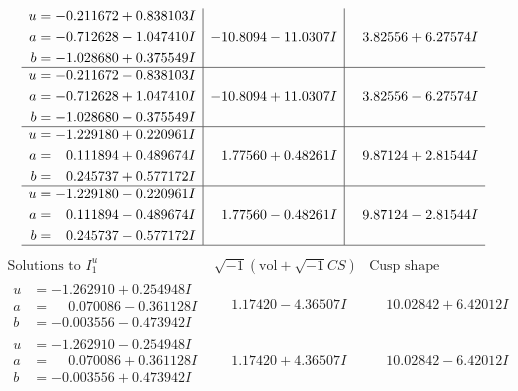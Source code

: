 \documentclass[1p]{elsarticle_modified}
\theoremstyle{definition}
\newcommand{\I}{\sqrt{-1}}
\begin{document}
$$\begin{array}{c|c|c}
\begin{aligned}
u &= -0.211672 + 0.838103 I \\
a &= -0.712628 - 1.047410 I \\
b &= -1.028680 + 0.375549 I\end{aligned}
 & -10.8094 - 11.0307 I & \phantom{-}3.82556 + 6.27574 I \\ \hline\begin{aligned}
u &= -0.211672 - 0.838103 I \\
a &= -0.712628 + 1.047410 I \\
b &= -1.028680 - 0.375549 I\end{aligned}
 & -10.8094 + 11.0307 I & \phantom{-}3.82556 - 6.27574 I \\ \hline\begin{aligned}
u &= -1.229180 + 0.220961 I \\
a &= \phantom{-}0.111894 + 0.489674 I \\
b &= \phantom{-}0.245737 + 0.577172 I\end{aligned}
 & \phantom{-}1.77560 + 0.48261 I & \phantom{-}9.87124 + 2.81544 I \\ \hline\begin{aligned}
u &= -1.229180 - 0.220961 I \\
a &= \phantom{-}0.111894 - 0.489674 I \\
b &= \phantom{-}0.245737 - 0.577172 I\end{aligned}
 & \phantom{-}1.77560 - 0.48261 I & \phantom{-}9.87124 - 2.81544 I\\
 \hline 
 \end{array}$$\newpage$$\begin{array}{c|c|c}  
\text{Solutions to }I^u_{1}& \I (\text{vol} + \sqrt{-1}CS) & \text{Cusp shape}\\
 \hline 
\begin{aligned}
u &= -1.262910 + 0.254948 I \\
a &= \phantom{-}0.070086 - 0.361128 I \\
b &= -0.003556 - 0.473942 I\end{aligned}
 & \phantom{-}1.17420 - 4.36507 I & \phantom{-}10.02842 + 6.42012 I \\ \hline\begin{aligned}
u &= -1.262910 - 0.254948 I \\
a &= \phantom{-}0.070086 + 0.361128 I \\
b &= -0.003556 + 0.473942 I\end{aligned}
 & \phantom{-}1.17420 + 4.36507 I & \phantom{-}10.02842 - 6.42012 I \\ \hline\begin{aligned}

\end{aligned}
\end{array}$$
\end{document}
